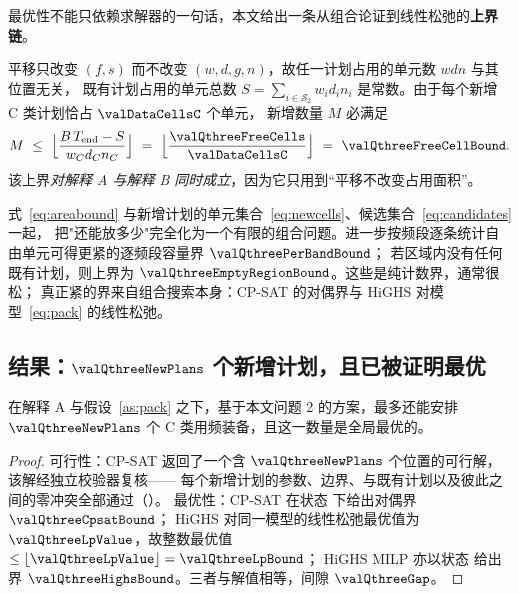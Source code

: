 最优性不能只依赖求解器的一句话，本文给出一条从组合论证到线性松弛的\textbf{上界链}。

\begin{proposition}[面积守恒与容量上界]\label{prop:area}
平移只改变 $(f,s)$ 而不改变 $(w,d,g,n)$，故任一计划占用的单元数 $wdn$ 与其位置无关，
既有计划占用的单元总数 $S=\sum_{i\in\mathcal{S}_2}w_id_in_i$ 是常数。由于每个新增 C 类计划恰占 $\valDataCellsC$ 个单元，
新增数量 $M$ 必满足
\begin{equation}\label{eq:areabound}
  M\ \le\ \Bigl\lfloor \frac{B\,T_{\mathrm{end}}-S}{w_Cd_Cn_C}\Bigr\rfloor
  \ =\ \Bigl\lfloor \frac{\valQthreeFreeCells}{\valDataCellsC}\Bigr\rfloor\ =\ \valQthreeFreeCellBound .
\end{equation}
该上界\emph{对解释 A 与解释 B 同时成立}，因为它只用到“平移不改变占用面积”。
\end{proposition}

式~\eqref{eq:areabound} 与新增计划的单元集合~\eqref{eq:newcells}、候选集合~\eqref{eq:candidates} 一起，
把"还能放多少"完全化为一个有限的组合问题。进一步按频段逐条统计自由单元可得更紧的逐频段容量界 $\valQthreePerBandBound$；
若区域内没有任何既有计划，则上界为 $\valQthreeEmptyRegionBound$。这些是纯计数界，通常很松；
真正紧的界来自组合搜索本身：CP-SAT 的对偶界与 HiGHS 对模型~\eqref{eq:pack} 的线性松弛。

\subsection{结果：$\valQthreeNewPlans$ 个新增计划，且已被证明最优}

\begin{table}[htbp]
\centering\small
\caption{问题 3 的解与上界链。三个独立的上界（CP-SAT 对偶界、HiGHS 线性松弛界、HiGHS MILP 界）
与解值同为 $\valQthreeNewPlans$，故对偶间隙为零。末行为备选解释 B 的区间（第~\ref{sec:q3alt} 节）。}
\label{tab:q3summary}
\resizebox{\linewidth}{!}{}
\end{table}

\begin{theorem}[问题 3 的最优性]\label{thm:q3}
在解释 A 与假设~\ref{as:pack} 之下，基于本文问题 2 的方案，最多还能安排
$\boldsymbol{\valQthreeNewPlans}$ 个 C 类用频装备，且这一数量是全局最优的。
\end{theorem}
\begin{proof}
可行性：CP-SAT 返回了一个含 $\valQthreeNewPlans$ 个位置的可行解，该解经独立校验器复核——
每个新增计划的参数、边界、与既有计划以及彼此之间的零冲突全部通过（\valQthreeValidator{}）。
最优性：CP-SAT 在状态 \textsf{\valQthreeCpsatStatus} 下给出对偶界 $\valQthreeCpsatBound$；
HiGHS 对同一模型的线性松弛最优值为 $\valQthreeLpValue$，故整数最优值 $\le\lfloor\valQthreeLpValue\rfloor=\valQthreeLpBound$；
HiGHS MILP 亦以状态 \textsf{\valQthreeHighsStatus} 给出界 $\valQthreeHighsBound$。三者与解值相等，间隙 $\valQthreeGap$。
\end{proof}

